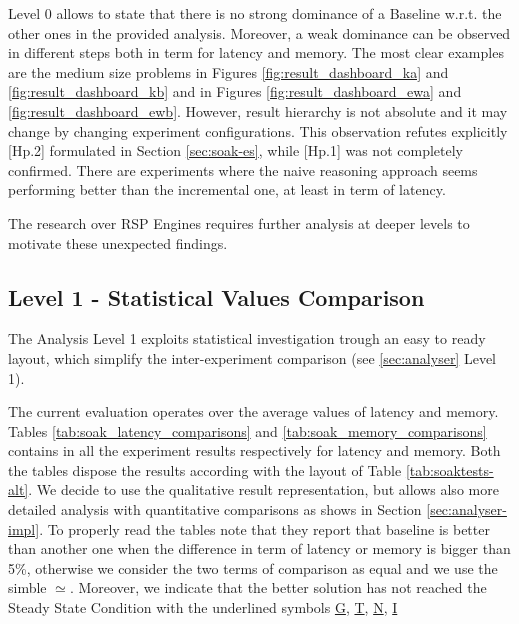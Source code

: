 Level 0 allows to state that there is no strong dominance of a Baseline w.r.t. the other ones in the provided analysis. Moreover, a weak dominance can be observed in different steps both in term for latency  and memory. The most clear examples are the medium size problems in Figures \ref{fig:result_dashboard_ka} and \ref{fig:result_dashboard_kb} and in Figures \ref{fig:result_dashboard_ewa} and \ref{fig:result_dashboard_ewb}. However, result hierarchy is not absolute and it may change by changing experiment configurations. This observation refutes explicitly [Hp.2] formulated in Section \ref{sec:soak-es}, while [Hp.1] was not completely confirmed. There are experiments where the naive  reasoning  approach seems performing better than the incremental one, at least in term of latency. 

The research over RSP Engines requires further analysis at deeper levels to motivate these unexpected findings.

%


\subsection{Level 1 - Statistical Values Comparison}\label{sec:eval-level1}

The Analysis Level 1 exploits statistical investigation trough an easy to ready layout, which simplify the inter-experiment comparison (see \ref{sec:analyser} Level 1).



The current evaluation operates over the average values of latency and memory. Tables \ref{tab:soak_latency_comparisons} and \ref{tab:soak_memory_comparisons} contains in all the experiment results respectively for latency and memory.  Both the tables dispose the results according with the layout of Table \ref{tab:soaktests-alt}. We decide to use the qualitative result representation, but \name allows also more detailed analysis with quantitative comparisons as shows in Section \ref{sec:analyser-impl}. To properly read the tables note that they report that baseline is better than another one when the difference in term of latency or memory is bigger than 5\%, otherwise we consider the two terms of comparison as equal and we use the simble $\simeq$.
Moreover, we indicate that the better solution has not reached the Steady State Condition with the underlined symbols \underline{G}, \underline{T}, \underline{N}, \underline{I}

